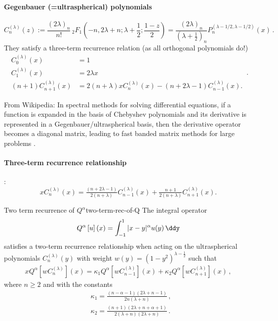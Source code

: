 \paragraph{Gegenbauer (=ultraspherical) polynomials}
$$C_{n}^{{( \lambda )}}(z) := {\frac  {(2\lambda )_{n}}{n!}}\,_{2}F_{1}\left(-n,2\lambda +n;\lambda +{\frac  {1}{2}};{\frac  {1-z}{2}}\right) = {\frac  {(2\lambda )_{n}}{(\lambda +{\frac  {1}{2}})_{{n}}}}P_{n}^{{(\lambda -1/2,\lambda -1/2)}}(x)\,.$$
They satisfy a three-term recurrence relation (as all orthogonal polynomials do!)
$${ {\begin{aligned}C_{0}^{(\lambda )}(x)&=1\\C_{1}^{(\lambda )}(x)&=2\lambda x\\(n+1)C_{n+1}^{(\lambda )}(x)&=2(n+\lambda )xC_{n}^{(\lambda )}(x)-(n+2\lambda -1)C_{n-1}^{(\lambda )}(x).\end{aligned}}}\,.$$

From Wikipedia: In spectral methods for solving differential equations, if a function is expanded in the basis of Chebyshev polynomials and its derivative is represented in a Gegenbauer/ultraspherical basis, then the derivative operator becomes a diagonal matrix, leading to fast banded matrix methods for large problems \parencite{2013-a-fast-and-well-conditioned-spectral-method}.

\paragraph{Three-term recurrence relationship}
\cite[18.9.1]{2018-nist}:
\begin{equation}\label{eq:ultraspherical-rec}
  x C_n^{(\lambda)}(x) = \tfrac{(n+2\lambda-1)}{2(n+\lambda)}C_{n-1}^{(\lambda)}(x) + \tfrac{n+1}{2(n+\lambda)}C_{n+1}^{(\lambda)}(x).
\end{equation}

\begin{theorem}{Two term recurrence of $Q^\alpha$}{two-term-rec-of-Q}
  The integral operator
  \begin{equation*}
    Q^{\alpha} \left[u\right](x) = \int_{-1}^{1} | x-y |^{\alpha} u(y) \,\ddy
  \end{equation*}
  satisfies a two-term recurrence relationship when acting on the ultraspherical polynomials $C_n^{(\lambda)}(y)$ with weight $w(y) = (1-y^2)^{\lambda-\frac{1}{2}}$ such that
  \begin{align*}
    xQ^{\alpha}\left[wC_n^{(\lambda)}\right](x) = \kappa_1 Q^{\alpha}\left[ wC_{n-1}^{(\lambda)}\right](x) +\kappa_2 Q^{\alpha}\left[ w C_{n+1}^{(\lambda)}\right](x)\,,
  \end{align*}
  where $n\geq2$ and with the constants
  \begin{align*}
     & \kappa_1 = \frac{(n-\alpha-1) (2 \lambda +n-1)}{2 n (\lambda +n)}\,,              \\
     & \kappa_2 = \frac{(n+1) (2 \lambda +n+\alpha+1)}{2 (\lambda +n) (2 \lambda +n)}\,.
  \end{align*}
\end{theorem}
